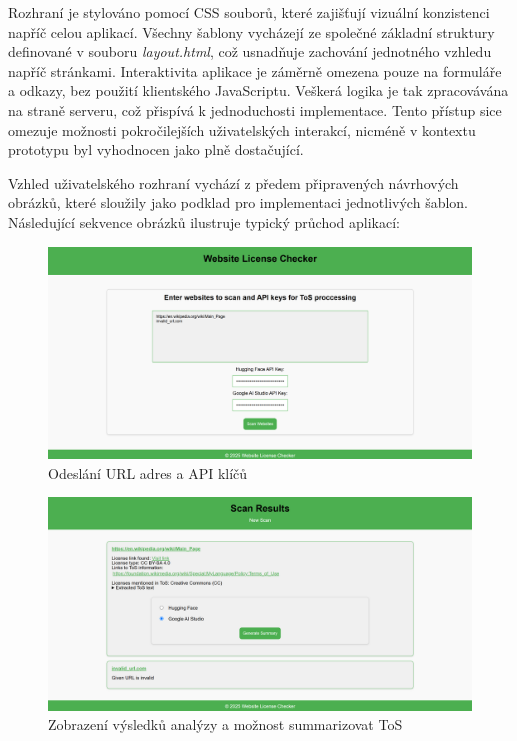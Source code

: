 Rozhraní je stylováno pomocí CSS souborů, které zajišťují vizuální konzistenci napříč celou aplikací.
Všechny šablony vycházejí ze společné základní struktury definované v souboru \textit{layout.html}, což usnadňuje zachování jednotného vzhledu napříč stránkami.
Interaktivita aplikace je záměrně omezena pouze na formuláře a odkazy, bez použití klientského JavaScriptu.
Veškerá logika je tak zpracovávána na straně serveru, což přispívá k jednoduchosti implementace.
Tento přístup sice omezuje možnosti pokročilejších uživatelských interakcí, nicméně v kontextu prototypu byl vyhodnocen jako plně dostačující.

Vzhled uživatelského rozhraní vychází z předem připravených návrhových obrázků, které sloužily jako podklad pro implementaci jednotlivých šablon.
Následující sekvence obrázků ilustruje typický průchod aplikací:

    \begin{figure}[!htbp]
        \centering
        \includegraphics[width=\linewidth]{images/index_imp.png}
        \caption{Odeslání URL adres a API klíčů}
        \label{fig:index_imp.png}
    \end{figure}

    \begin{figure}[!htbp]
        \centering
        \includegraphics[width=\linewidth]{images/scans_imp.png}
        \caption{Zobrazení výsledků analýzy a možnost summarizovat ToS}
        \label{fig:scans_imp.png}
    \end{figure}

